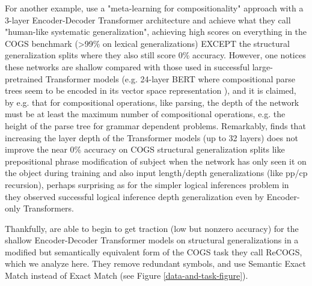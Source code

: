 \documentclass[11pt]{article}
\begin{document}
For another example, \cite{lake2023human} use a "meta-learning for compositionality" approach with a 3-layer Encoder-Decoder Transformer architecture and achieve what they call "human-like systematic generalization", achieving high scores on everything in the COGS benchmark (>99\% on lexical generalizations) EXCEPT the structural generalization splits where they also still score 0\% accuracy.
However, one notices these networks are shallow compared with those used in successful large-pretrained Transformer models (e.g. 24-layer BERT where compositional parse trees seem to be encoded in its vector space representation \cite{hewitt-manning-2019-structural}), and it is claimed, by e.g. \cite{Csordas2022} that for compositional operations, like parsing, the depth of the network must be at least the maximum number of compositional operations, e.g. the height of the parse tree for grammar dependent problems. Remarkably, \cite{petty2024impactdepthcompositionalgeneralization} finds that increasing the layer depth of the Transformer models (up to 32 layers) does not improve the near 0\% accuracy on COGS structural generalization splits like prepositional phrase modification of subject when the network has only seen it on the object during training and also input length/depth generalizations (like pp/cp recursion), perhaps surprising as for the simpler logical inferences problem in \cite{Clark2020} they observed successful logical inference depth generalization even by Encoder-only Transformers.

Thankfully, \cite{Wu2023} are able to begin to get traction (low but nonzero accuracy) for the shallow Encoder-Decoder Transformer models on structural generalizations in a modified but semantically equivalent form of the COGS task they call ReCOGS, which we analyze here. They remove redundant symbols, and use Semantic Exact Match instead of Exact Match (see Figure \ref{data-and-task-figure}).

\end{document}
